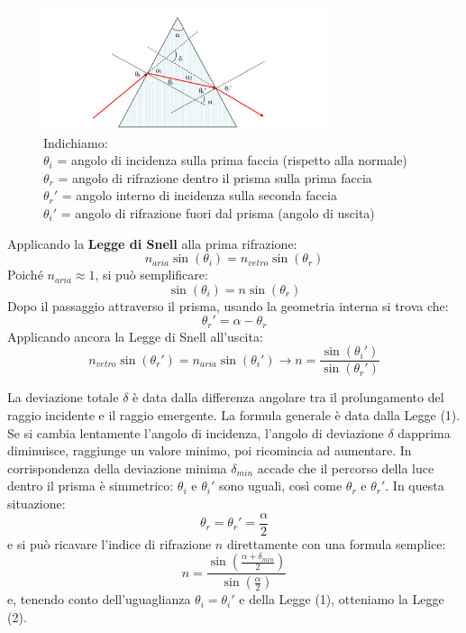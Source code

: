 \begin{figure}[H]
	\centering
	\includegraphics[width=0.75\textwidth]{./figures/prismateoria}
	\caption{Indichiamo: \\
		$\theta_i$ = angolo di incidenza sulla prima faccia (rispetto alla normale) \\
		$\theta_r$ = angolo di rifrazione dentro il prisma sulla prima faccia \\
		$\theta_r'$ = angolo interno di incidenza sulla seconda faccia \\
		$\theta_i'$ = angolo di rifrazione fuori dal prisma (angolo di uscita)}
\end{figure}

Applicando la \textbf{Legge di Snell} alla prima rifrazione:
\begin{equation}
	n_{aria}\sin(\theta_i)=n_{vetro}\sin(\theta_r)
\end{equation}
Poiché $n_{aria} \approx 1$, si può semplificare:
\begin{equation}
	\sin(\theta_i)=n\sin(\theta_r)
\end{equation}
Dopo il passaggio attraverso il prisma, usando la geometria interna si trova che:
\begin{equation}
	\theta_r'=\alpha-\theta_r
\end{equation}
Applicando ancora la Legge di Snell all'uscita:
\begin{equation}
	n_{vetro}\sin(\theta_r')=n_{aria}\sin(\theta_i') \rightarrow n=\frac{\sin(\theta_i')}{\sin(\theta_r')}
\end{equation}

La deviazione totale $\delta$ è data dalla differenza angolare tra il prolungamento del raggio incidente e il raggio emergente. La formula generale è data dalla Legge (1). Se si cambia lentamente l'angolo di incidenza, l'angolo di deviazione $\delta$ dapprima diminuisce, raggiunge un valore minimo, poi ricomincia ad aumentare. In corrispondenza della deviazione minima $\delta_{min}$ accade che il percorso della luce dentro il prisma è simmetrico: $\theta_i$ e $\theta_i'$ sono uguali, così come $\theta_r$ e $\theta_r'$. In questa situazione:
\begin{equation}
	\theta_r = \theta_r'=\frac{\alpha}{2}
\end{equation}
e si può ricavare l'indice di rifrazione $n$ direttamente con una formula semplice:
\begin{equation}
	n=\frac{\sin\left(\frac{\alpha+\delta_{min}}{2}\right)}{\sin\left(\frac{\alpha}{2}\right)}
\end{equation}
e, tenendo conto dell'uguaglianza $\theta_i=\theta_i'$ e della Legge (1), otteniamo la Legge (2).


